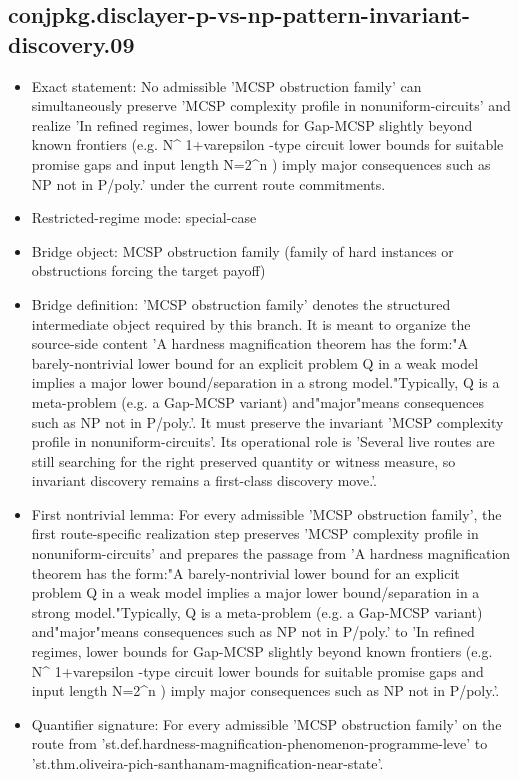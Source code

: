 \documentclass[11pt]{article}
\begin{document}
\subsection*{conjpkg.disclayer-p-vs-np-pattern-invariant-discovery.09}
\begin{itemize}
\item Exact statement: No admissible 'MCSP obstruction family' can simultaneously preserve 'MCSP complexity profile in nonuniform-circuits' and realize 'In refined regimes, lower bounds for Gap-MCSP slightly beyond known frontiers (e.g. N\textasciicircum{} 1+varepsilon -type circuit lower bounds for suitable promise gaps and input length N=2\textasciicircum{}n ) imply major consequences such as NP not in P/poly.' under the current route commitments.
\item Restricted-regime mode: special-case
\item Bridge object: MCSP obstruction family (family of hard instances or obstructions forcing the target payoff)
\item Bridge definition: 'MCSP obstruction family' denotes the structured intermediate object required by this branch. It is meant to organize the source-side content 'A hardness magnification theorem has the form:"A barely-nontrivial lower bound for an explicit problem Q in a weak model implies a major lower bound/separation in a strong model."Typically, Q is a meta-problem (e.g. a Gap-MCSP variant) and"major"means consequences such as NP not in P/poly.'. It must preserve the invariant 'MCSP complexity profile in nonuniform-circuits'. Its operational role is 'Several live routes are still searching for the right preserved quantity or witness measure, so invariant discovery remains a first-class discovery move.'.
\item First nontrivial lemma: For every admissible 'MCSP obstruction family', the first route-specific realization step preserves 'MCSP complexity profile in nonuniform-circuits' and prepares the passage from 'A hardness magnification theorem has the form:"A barely-nontrivial lower bound for an explicit problem Q in a weak model implies a major lower bound/separation in a strong model."Typically, Q is a meta-problem (e.g. a Gap-MCSP variant) and"major"means consequences such as NP not in P/poly.' to 'In refined regimes, lower bounds for Gap-MCSP slightly beyond known frontiers (e.g. N\textasciicircum{} 1+varepsilon -type circuit lower bounds for suitable promise gaps and input length N=2\textasciicircum{}n ) imply major consequences such as NP not in P/poly.'.
\item Quantifier signature: For every admissible 'MCSP obstruction family' on the route from 'st.def.hardness-magnification-phenomenon-programme-leve' to 'st.thm.oliveira-pich-santhanam-magnification-near-state'.

\end{itemize}
\end{document}
